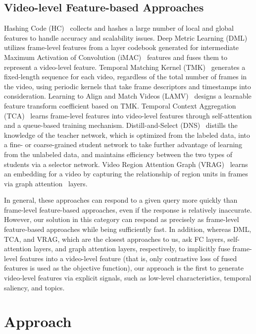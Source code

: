 \documentclass[10pt,twocolumn,letterpaper]{article}
\begin{document}
    \subsection{Video-level Feature-based Approaches}
        Hashing Code (HC)~\cite{song2013effective} collects and hashes a large number of local and global features to handle accuracy and scalability issues. Deep Metric Learning (DML)~\cite{kordopatis2017near} utilizes frame-level features from a layer codebook generated for intermediate Maximum Activation of Convolution (iMAC)~\cite{kordopatis2017nearimac} features and fuses them to represent a video-level feature. Temporal Matching Kernel (TMK)~\cite{poullot2015temporal} generates a fixed-length sequence for each video, regardless of the total number of frames in the video, using periodic kernels that take frame descriptors and timestamps into consideration. Learning to Align and Match Videos (LAMV)~\cite{baraldi2018lamv} designs a learnable feature transform coefficient based on TMK. Temporal Context Aggregation (TCA)~\cite{shao2021temporal} learns frame-level features into video-level features through self-attention and a queue-based training mechanism. Distill-and-Select (DNS)~\cite{kordopatis2022dns} distills the knowledge of the teacher network, which is optimized from the labeled data, into a fine- or coarse-grained student network to take further advantage of learning from the unlabeled data, and maintains efficiency between the two types of students via a selector network. Video Region Attention Graph (VRAG)~\cite{ng2022vrag} learns an embedding for a video by capturing the relationship of region units in frames via graph attention~\cite{velivckovic2017graph} layers.
        
        In general, these approaches can respond to a given query more quickly than frame-level feature-based approaches, even if the response is relatively inaccurate. However, our solution in this category can respond as precisely as frame-level feature-based approaches while being sufficiently fast. In addition, whereas DML, TCA, and VRAG, which are the closest approaches to us, ask FC layers, self-attention layers, and graph attention layers, respectively, to implicitly fuse frame-level features into a video-level feature (that is, only contrastive loss of fused features is used as the objective function), our approach is the first to generate video-level features via explicit signals, such as low-level characteristics, temporal saliency, and topics.

\section{Approach}
\end{document}
